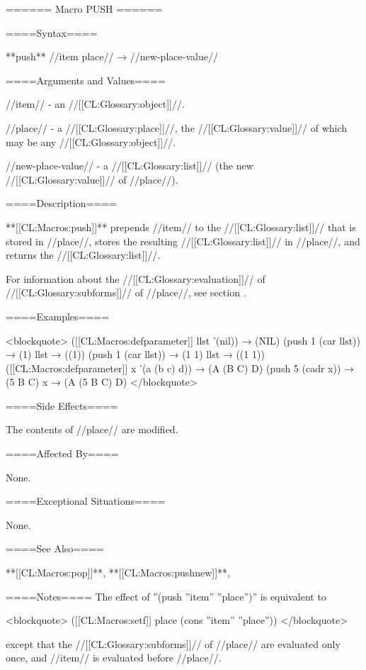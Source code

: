 ====== Macro PUSH ======

====Syntax====

**push** //item place// → //new-place-value//

====Arguments and Values====

//item// - an //[[CL:Glossary:object]]//.

//place// - a //[[CL:Glossary:place]]//, the //[[CL:Glossary:value]]// of which may be any //[[CL:Glossary:object]]//.

//new-place-value// - a //[[CL:Glossary:list]]// (the new //[[CL:Glossary:value]]// of //place//).

====Description====

**[[CL:Macros:push]]** prepends //item// to the //[[CL:Glossary:list]]// that is stored in //place//, stores the resulting //[[CL:Glossary:list]]// in //place//, and returns the //[[CL:Glossary:list]]//.

For information about the //[[CL:Glossary:evaluation]]// of //[[CL:Glossary:subforms]]// of //place//, see section {\secref\GenRefSubFormEval}.

====Examples====

<blockquote> ([[CL:Macros:defparameter]] llst '(nil)) → (NIL) (push 1 (car llst)) → (1) llst → ((1)) (push 1 (car llst)) → (1 1) llst → ((1 1)) ([[CL:Macros:defparameter]] x '(a (b c) d)) → (A (B C) D) (push 5 (cadr x)) → (5 B C) x → (A (5 B C) D) </blockquote>

====Side Effects====

The contents of //place// are modified.

====Affected By====

None.

====Exceptional Situations====

None.

====See Also====

**[[CL:Macros:pop]]**, **[[CL:Macros:pushnew]]**, {\secref\GeneralizedReference}

====Notes==== The effect of ''(push ''item'' ''place'')'' is equivalent to

<blockquote> ([[CL:Macros:setf]] place (cons ''item'' ''place'')) </blockquote>

except that the //[[CL:Glossary:subforms]]// of //place// are evaluated only once, and //item// is evaluated before //place//.

  
